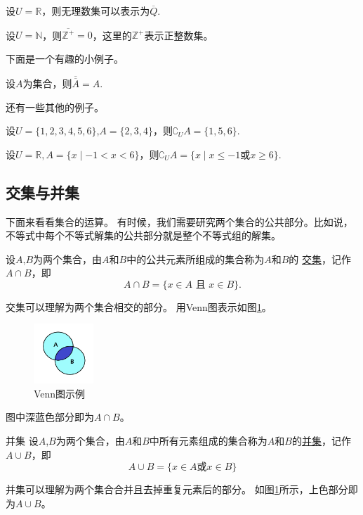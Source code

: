 \documentclass[lang=cn,math=cm,chinesefont=nofont,11pt,scheme=chinese,onecol]{elegantbook}
\begin{document}
\begin{example}
  设$U=\mathbb{R}$，则无理数集可以表示为$\overline{Q}$.
\end{example}

\begin{example}
  设$U=\mathbb{N}$，则$\overline{\mathbb{Z}^+}={0}$，这里的$\mathbb{Z}^+$表示正整数集。
\end{example}

下面是一个有趣的小例子。

\begin{example}
  设$A$为集合，则$\overline{\overline{A}}=A$.
\end{example}

还有一些其他的例子。

\begin{example}
  设$U=\{1,2,3,4,5,6\}$,$A=\{2,3,4\}$，则$\complement_{U}A=\{1,5,6\}.$
\end{example}

\begin{example}
  设$U=\mathbb{R},A=\{x\mid -1<x<6\}$，则$\complement_{U}A=\{x\mid x\leq -1\text{或}x\geq 6\}.$
\end{example}

\subsection{交集与并集}
下面来看看集合的运算。
有时候，我们需要研究两个集合的公共部分。比如说，不等式中每个不等式解集的公共部分就是整个不等式组的解集。
\begin{definition}[交集]
  设$A$,$B$为两个集合，由$A$和$B$中的公共元素所组成的集合称为$A$和$B$的
  \underline{交集}，记作$A\cap B$，即$$A\cap B=\{x\in A\text{ 且 }x\in B\}.$$
\end{definition}
  交集可以理解为两个集合相交的部分。
  用Venn图表示如图\ref{img:Venn2}。
  \begin{figure}[h]
    \centering
    \includegraphics[width=0.2\textwidth]{image/Venn2.png}
    \caption{Venn图示例}
    \label{img:Venn2}
  \end{figure}
  图中深蓝色部分即为$A\cap B$。

\begin{definition}{并集}
  设$A$,$B$为两个集合，由$A$和$B$中所有元素组成的集合称为$A$和$B$的\underline{并集}，记作$A\cup B$，即
  $$A\cup B=\{x\in A\text{或}x\in B\}$$
\end{definition}
  并集可以理解为两个集合合并且去掉重复元素后的部分。
  如图\ref{img:Venn2}所示，上色部分即为$A\cup B$。 
\end{document}
